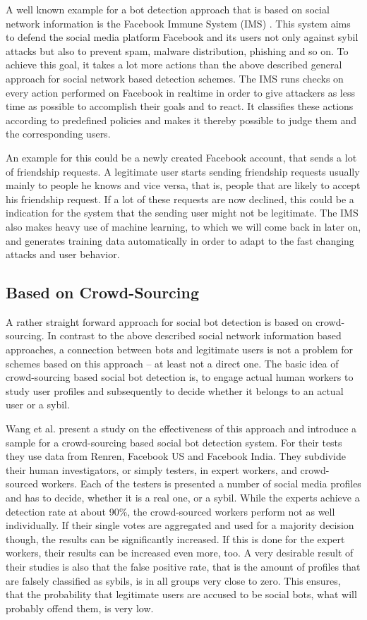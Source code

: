 A well known example for a bot detection approach that is based on social network information is the Facebook Immune System (IMS) \cite{fis}. This system aims to defend the social media platform Facebook and its users not only against sybil attacks but also to prevent spam, malware distribution, phishing and so on.  To achieve this goal, it takes a lot more actions than the above described general approach for social network based detection schemes. The IMS runs checks on every action performed on Facebook in realtime in order to give attackers as less time as possible to accomplish their goals and to react. It classifies these actions according to predefined policies and makes it thereby possible to judge them and the corresponding users.

An example for this could be a newly created Facebook account, that sends a lot of friendship requests. A legitimate user starts sending friendship requests usually mainly to people he knows and vice versa, that is, people that are likely to accept his friendship request. If a lot of these requests are now declined, this could be a indication for the system that the sending user might not be legitimate.  The IMS also makes heavy use of machine learning, to which we will come back in later on, and generates training data automatically in order to adapt to the fast changing attacks and user behavior.

\subsection{Based on Crowd-Sourcing}
A rather straight forward approach for social bot detection is based on crowd-sourcing. In contrast to the above described social network information based approaches, a connection between bots and legitimate users is not a problem for schemes based on this approach -- at least not a direct one. The basic idea of crowd-sourcing based social bot detection is, to engage actual human workers to study user profiles and subsequently to decide whether it belongs to an actual user or a sybil.

Wang et al. \cite{wangcrowd} present a study on the effectiveness of this approach and introduce a sample for a crowd-sourcing based social bot detection system.  For their tests they use data from Renren, Facebook US and Facebook India. They subdivide their human investigators, or simply testers, in expert workers, and crowd-sourced workers.  Each of the testers is presented a number of social media profiles and has to decide, whether it is a real one, or a sybil. While the experts achieve a detection rate at about 90\%, the crowd-sourced workers perform not as well individually. If their single votes are aggregated and used for a majority decision though, the results can be significantly increased. If this is done for the expert workers, their results can be increased even more, too. A very desirable result of their studies is also that the false positive rate, that is the amount of profiles that are falsely classified as sybils, is in all groups very close to zero. This ensures, that the probability that legitimate users are accused to be social bots, what will probably offend them, is very low.

